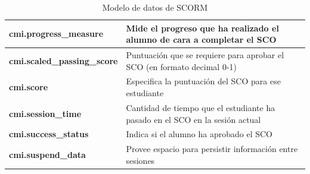 \begin{table}[H]
\begin{tabular}{|p{2.1in}|p{3.8in}|}
\textbf{cmi.progress\_measure} & Mide el progreso que ha realizado el alumno de cara a completar el SCO \\ \hline 
\textbf{cmi.scaled\_passing\_score} & Puntuación que se requiere para aprobar el SCO (en formato decimal 0-1) \\ \hline 
\textbf{cmi.score} & Especifica la puntuación del SCO para ese estudiante \\ \hline 
\textbf{cmi.session\_time} & Cantidad de tiempo que el estudiante ha pasado en el SCO en la sesión actual \\ \hline 
\textbf{cmi.success\_status} & Indica si el alumno ha aprobado el SCO \\ \hline 
\textbf{cmi.suspend\_data} & Provee espacio para persistir información entre sesiones \\ \hline 
\end{tabular}
\caption[Modelo de datos de SCORM]{Modelo de datos de SCORM}
\label{table:name}
\end{table}
